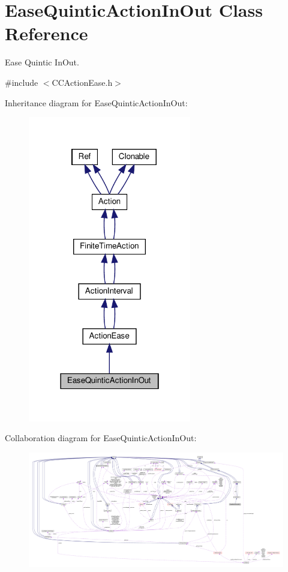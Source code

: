\hypertarget{classEaseQuinticActionInOut}{}\section{Ease\+Quintic\+Action\+In\+Out Class Reference}
\label{classEaseQuinticActionInOut}


Ease Quintic In\+Out.  




{\ttfamily \#include $<$C\+C\+Action\+Ease.\+h$>$}



Inheritance diagram for Ease\+Quintic\+Action\+In\+Out\+:
\nopagebreak
\begin{figure}[H]
\begin{center}
\leavevmode
\includegraphics[width=202pt]{classEaseQuinticActionInOut__inherit__graph}
\end{center}
\end{figure}


Collaboration diagram for Ease\+Quintic\+Action\+In\+Out\+:
\nopagebreak
\begin{figure}[H]
\begin{center}
\leavevmode
\includegraphics[width=350pt]{classEaseQuinticActionInOut__coll__graph}
\end{center}
\end{figure}
